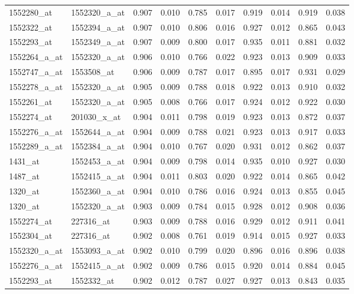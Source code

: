 \documentclass[a4paper, 12pt]{report}
\begin{document}
\begin{footnotesize}
\begin{longtable}{ | >{}m{2cm}| >{}m{2cm} | >{}m{0.8cm}| >{}m{0.8cm} |>{}m{0.8cm}| >{}m{0.8cm} |>{}m{0.8cm}| >{}m{0.8cm} |>{}m{0.8cm}| >{}m{0.8cm} |}
  1552280\_at & 1552320\_a\_at & 0.907 & 0.010 & 0.785 & 0.017 & 0.919 & 0.014 & 0.919 & 0.038 \\ 
  1552322\_at & 1552394\_a\_at & 0.907 & 0.010 & 0.806 & 0.016 & 0.927 & 0.012 & 0.865 & 0.043 \\ 
  1552293\_at & 1552349\_a\_at & 0.907 & 0.009 & 0.800 & 0.017 & 0.935 & 0.011 & 0.881 & 0.032 \\ 
  1552264\_a\_at & 1552320\_a\_at & 0.906 & 0.010 & 0.766 & 0.022 & 0.923 & 0.013 & 0.909 & 0.033 \\ 
  1552747\_a\_at & 1553508\_at & 0.906 & 0.009 & 0.787 & 0.017 & 0.895 & 0.017 & 0.931 & 0.029 \\ 
  1552278\_a\_at & 1552320\_a\_at & 0.905 & 0.009 & 0.788 & 0.018 & 0.922 & 0.013 & 0.910 & 0.032 \\ 
  1552261\_at & 1552320\_a\_at & 0.905 & 0.008 & 0.766 & 0.017 & 0.924 & 0.012 & 0.922 & 0.030 \\ 
  1552274\_at & 201030\_x\_at & 0.904 & 0.011 & 0.798 & 0.019 & 0.923 & 0.013 & 0.872 & 0.037 \\ 
  1552276\_a\_at & 1552644\_a\_at & 0.904 & 0.009 & 0.788 & 0.021 & 0.923 & 0.013 & 0.917 & 0.033 \\ 
  1552289\_a\_at & 1552384\_a\_at & 0.904 & 0.010 & 0.767 & 0.020 & 0.931 & 0.012 & 0.862 & 0.037 \\ 
  1431\_at & 1552453\_a\_at & 0.904 & 0.009 & 0.798 & 0.014 & 0.935 & 0.010 & 0.927 & 0.030 \\ 
  1487\_at & 1552415\_a\_at & 0.904 & 0.011 & 0.803 & 0.020 & 0.922 & 0.014 & 0.865 & 0.042 \\ 
  1320\_at & 1552360\_a\_at & 0.904 & 0.010 & 0.786 & 0.016 & 0.924 & 0.013 & 0.855 & 0.045 \\ 
  1320\_at & 1552320\_a\_at & 0.903 & 0.009 & 0.784 & 0.015 & 0.928 & 0.012 & 0.908 & 0.036 \\ 
  1552274\_at & 227316\_at & 0.903 & 0.009 & 0.788 & 0.016 & 0.929 & 0.012 & 0.911 & 0.041 \\ 
  1552304\_at & 227316\_at & 0.902 & 0.008 & 0.761 & 0.019 & 0.914 & 0.015 & 0.927 & 0.033 \\ 
  1552320\_a\_at & 1553093\_a\_at & 0.902 & 0.010 & 0.799 & 0.020 & 0.896 & 0.016 & 0.896 & 0.038 \\ 
  1552276\_a\_at & 1552415\_a\_at & 0.902 & 0.009 & 0.786 & 0.015 & 0.920 & 0.014 & 0.884 & 0.045 \\ 
  1552293\_at & 1552332\_at & 0.902 & 0.012 & 0.787 & 0.027 & 0.927 & 0.013 & 0.843 & 0.035 \\ 

\end{longtable}
\end{footnotesize}
\end{document}
